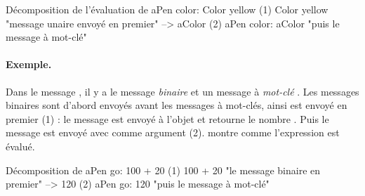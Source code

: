 \documentclass[a4paper,10pt,twoside]{book}
\begin{document}
\begin{example}[decColor]{D\'ecomposition de l'\'evaluation de }{}
        aPen color: Color yellow
(1)                       Color yellow        "message unaire envoy\'e en premier"
                        --> aColor
(2)   aPen color: aColor                 "puis le message \`a mot-cl\'e"
\end{example}

\paragraph{Exemple.} Dans le message , il y a le message \emph{binaire}  et un message \`a \emph{mot-cl\'e} . Les messages binaires sont d'abord envoy\'es avant les messages \`a mot-cl\'es, ainsi  est envoy\'e en premier (1) : le message  est envoy\'e \`a l'objet  et retourne le nombre . Puis le message  est envoy\'e avec comme argument  (2).
 montre comme l'expression est \'evalu\'e. 

\begin{example}[decGo]{D\'ecomposition de }{}
      aPen go: 100 + 20   
(1)                 100 + 20           "le message binaire en premier"
                   -->   120
(2)  aPen go: 120                   "puis le message \`a mot-cl\'e"
\end{example}
\end{document}
